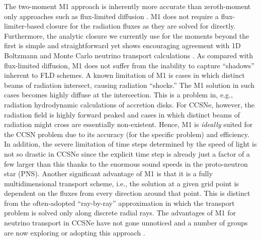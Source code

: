 \documentclass[12pt]{article}
\begin{document}
The two-moment M1 approach is inherently more accurate than zeroth-moment only approaches such as flux-limited diffusion \citep[e.g.,][]{bruenn:2013, Dolence:2015, Lentz:2015}. 
M1 does not require a flux-limiter-based closure for the radiation fluxes as they are solved for directly.
Furthermore, the analytic closure we currently use for the moments beyond the first is simple and straightforward yet shows encouraging agreement with 1D Boltzmann and Monte Carlo neutrino transport calculations \citep{oconnor:2015, Murchikova:2017}.
As compared with flux-limited diffusion, M1 does not suffer from the inability to capture ``shadows'' inherent to FLD schemes.
A known limitation of M1 is cases in which distinct beams of radiation intersect, causing radiation ``shocks.''
The M1 solution in such cases becomes highly diffuse at the intersection.
This is a problem in, e.g., radiation hydrodynamic calculations of accretion disks.
For CCSNe, however, the radiation field is highly forward peaked and cases in which distinct beams of radiation might cross are essentially non-existent.
Hence, M1 is {\it ideally} suited for the CCSN problem due to its accuracy (for the specific problem) and efficiency.
In addition, the severe limitation of time steps determined by the speed of light is not so drastic in CCSNe since the explicit time step is already just a factor of a few larger than this thanks to the enormous sound speeds in the proto-neutron star (PNS).
Another significant advantage of M1 is that it is a fully multidimensional transport scheme, i.e., the solution at a given grid point is dependent on the fluxes from every direction around that point.
This is distinct from the often-adopted ``ray-by-ray'' approximation \citep[e.g.,][]{bruenn:2013, bruenn:2016, muller:2012a, Hanke:2013, Melson:2015, Lentz:2015} in which the transport problem is solved only along discrete radial rays.
The advantages of M1 for neutrino transport in CCSNe have not gone unnoticed and a number of groups are now exploring or adopting this approach \citep{Just:2015, Kuroda:2016, Skinner:2016, Roberts:2016}.
\end{document}
